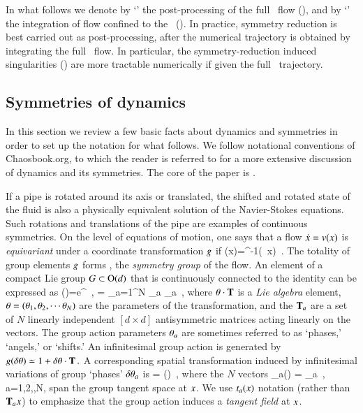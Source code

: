 In what follows we denote by `\mframes' the post-processing of the full
\statesp\ flow (), and by `\mslices' the
integration of flow confined to the \reducedsp\ ().
In practice, symmetry reduction is best carried out as post-processing,
after the numerical trajectory is obtained by integrating the full
\statesp\ flow. In particular, the symmetry-reduction induced
singularities () are more tractable numerically
if given the full \statesp\ trajectory.


\subsection{Symmetries of dynamics}
\label{sec:SymmDyn}

In this section we review a few basic facts about dynamics and symmetries
in order to set up the notation for what follows. We follow notational
conventions of Chaosbook.org, to which the reader is referred
to for a more extensive discussion of dynamics and its symmetries. The
core of the paper is .

If a pipe is rotated around its axis or translated, the shifted and
rotated state of the fluid is also a physically equivalent solution of
the Navier-Stokes equations. Such rotations and translations of the pipe
are examples of continuous symmetries. On the level of equations of
motion, one says that a flow $\dot{x}= v(x)$ is \emph{equivariant}
under a coordinate transformation $g$ if
\beq
\vel(x)=\LieEl^{-1}\vel(\LieEl \, x)
\,.
The totality of group elements
$g$ forms \Group, the {\em symmetry group} of the flow.
An element of a compact Lie group $G \subset \textrm{O}(d)$ that is
continuously connected to the identity can be expressed as
\beq
\LieEl(\gSpace)=e^{{\gSpace} \cdot \Lg }
    \,,\qquad
\gSpace \cdot \Lg = \sum_{a=1}^N \gSpace_a \Lg_a
\,,
where ${\bf \theta} \cdot \mathbf{T} $ is a \emph{Lie algebra} element, ${\bf \theta}
= ({\bf \theta}_1,{\bf \theta}_2,\cdots{\bf \theta}_N)$ are the parameters of the
transformation, and the $\mathbf{T}_a$ are a set of $N$ linearly independent
$[d\!\times\!d]$ antisymmetric matrices acting linearly on the {\statesp}
vectors. The group action parameters ${\bf \theta}_a$ are sometimes referred to as
`phases,' `angels,' or `shifts.'
An infinitesimal group action is generated by
$
g(\delta {\bf \theta}) \simeq 1 + \delta {\bf \theta} \cdot \mathbf{T}
\,.
$ %
A corresponding spatial transformation induced by infinitesimal
variations of group `phases' $\delta {\bf \theta}_a$ is
\beq
\delta {\ssp} = \delta \gSpace \cdot \groupTan(\ssp)
\,,
where the $N$ vectors
\beq
 \groupTan_{a}(\ssp) = \Lg _{a} \ssp
    \,,\qquad
 a=1,2,\cdots,N,
span the group tangent space at $x$. We use $t_a(x)$
notation (rather than $\mathbf{T}_{a}x$) to emphasize that the group action
induces a \emph{tangent field} at $x$.

